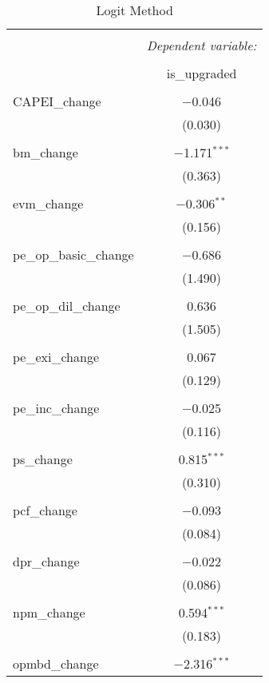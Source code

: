 \documentclass{article}
\begin{document}
\newpage

\begin{table}[!htbp] \centering 
  \footnotesize
  \caption{Logit Method} 
  \label{} 
\begin{tabular}{@{\extracolsep{5pt}}lc} 
\\[-1.8ex]\hline 
\hline \\[-1.8ex] 
 & \multicolumn{1}{c}{\textit{Dependent variable:}} \\ 
\cline{2-2} 
\\[-1.8ex] & is\_upgraded \\ 
\hline \\[-1.8ex] 
 CAPEI\_change & $-$0.046 \\ 
  & (0.030) \\ 
  & \\ 
 bm\_change & $-$1.171$^{***}$ \\ 
  & (0.363) \\ 
  & \\ 
 evm\_change & $-$0.306$^{**}$ \\ 
  & (0.156) \\ 
  & \\ 
 pe\_op\_basic\_change & $-$0.686 \\ 
  & (1.490) \\ 
  & \\ 
 pe\_op\_dil\_change & 0.636 \\ 
  & (1.505) \\ 
  & \\ 
 pe\_exi\_change & 0.067 \\ 
  & (0.129) \\ 
  & \\ 
 pe\_inc\_change & $-$0.025 \\ 
  & (0.116) \\ 
  & \\ 
 ps\_change & 0.815$^{***}$ \\ 
  & (0.310) \\ 
  & \\ 
 pcf\_change & $-$0.093 \\ 
  & (0.084) \\ 
  & \\ 
 dpr\_change & $-$0.022 \\ 
  & (0.086) \\ 
  & \\ 
 npm\_change & 0.594$^{***}$ \\ 
  & (0.183) \\ 
  & \\ 
 opmbd\_change & $-$2.316$^{***}$ \\ 

\end{tabular}
\end{table}
\end{document}
